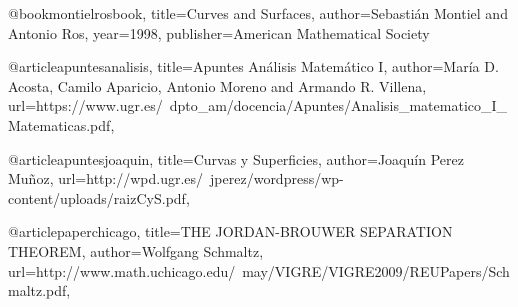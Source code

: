 @book{montielrosbook,
  title={Curves and Surfaces},
  author={Sebastián Montiel and Antonio Ros},
  year={1998},
  publisher={American Mathematical Society}
}

@article{apuntesanalisis,
  title={Apuntes Análisis Matemático I},
  author={María D. Acosta, Camilo Aparicio, Antonio Moreno and Armando R. Villena},
  url={https://www.ugr.es/~dpto_am/docencia/Apuntes/Analisis_matematico_I_Matematicas.pdf},
}

@article{apuntesjoaquin,
  title={Curvas y Superficies},
  author={Joaquín Perez Muñoz},
  url={http://wpd.ugr.es/~jperez/wordpress/wp-content/uploads/raizCyS.pdf},
}

@article{paperchicago,
  title={THE JORDAN-BROUWER SEPARATION THEOREM},
  author={Wolfgang Schmaltz},
  url={http://www.math.uchicago.edu/~may/VIGRE/VIGRE2009/REUPapers/Schmaltz.pdf},
}
